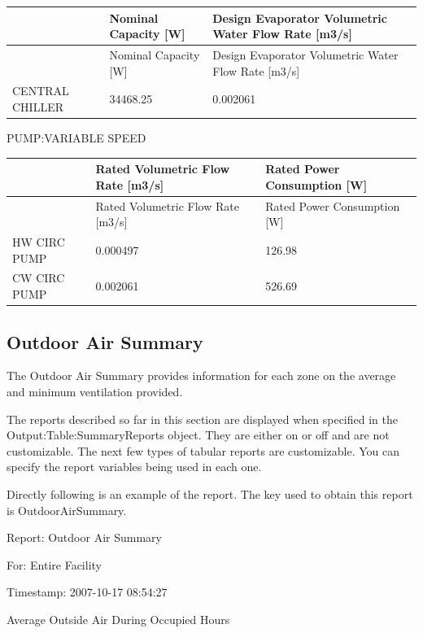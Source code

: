 \begin{longtable}[c]{>{\raggedright}p{1.5in}>{\raggedright}p{1.5in}>{\raggedright}p{3.0in}}
\toprule
~ & Nominal Capacity [W] & Design Evaporator Volumetric Water Flow Rate [m3/s] \tabularnewline
\midrule
\endfirsthead

\toprule
~ & Nominal Capacity [W] & Design Evaporator Volumetric Water Flow Rate [m3/s] \tabularnewline
\midrule
\endhead

CENTRAL CHILLER & 34468.25 & 0.002061 \tabularnewline
\bottomrule
\end{longtable}

PUMP:VARIABLE SPEED

\begin{longtable}[c]{>{\raggedright}p{1.5in}>{\raggedright}p{2.5in}>{\raggedright}p{2.0in}}
\toprule
~ & Rated Volumetric Flow Rate [m3/s] & Rated Power Consumption [W] \tabularnewline
\midrule
\endfirsthead

\toprule
~ & Rated Volumetric Flow Rate [m3/s] & Rated Power Consumption [W] \tabularnewline
\midrule
\endhead

HW CIRC PUMP & 0.000497 & 126.98 \tabularnewline
CW CIRC PUMP & 0.002061 & 526.69 \tabularnewline
\bottomrule
\end{longtable}

\subsection{Outdoor Air Summary}\label{outdoor-air-summary}

The Outdoor Air Summary provides information for each zone on the average and minimum ventilation provided.

The reports described so far in this section are displayed when specified in the Output:Table:SummaryReports object. They are either on or off and are not customizable. The next few types of tabular reports are customizable. You can specify the report variables being used in each one.

Directly following is an example of the report. The key used to obtain this report is OutdoorAirSummary.

Report: Outdoor Air Summary

For: Entire Facility

Timestamp: 2007-10-17 08:54:27

Average Outside Air During Occupied Hours

